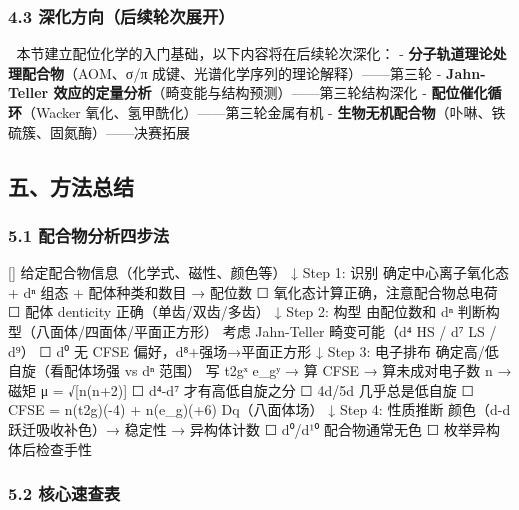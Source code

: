 \documentclass[a4paper,11pt]{ctexart}
\newenvironment{Shaded}{}{}
\newenvironment{Highlighting}{}{}
\newcommand{\NormalTok}[1]{#1}
\begin{document}
\subsubsection{4.3 深化方向（后续轮次展开）}\label{ux6df1ux5316ux65b9ux5411ux540eux7eedux8f6eux6b21ux5c55ux5f00}

🔷 本节建立配位化学的入门基础，以下内容将在后续轮次深化：
- \textbf{分子轨道理论处理配合物}（AOM、σ/π 成键、光谱化学序列的理论解释）------第三轮
- \textbf{Jahn-Teller 效应的定量分析}（畸变能与结构预测）------第三轮结构深化
- \textbf{配位催化循环}（Wacker 氧化、氢甲酰化）------第三轮金属有机
- \textbf{生物无机配合物}（卟啉、铁硫簇、固氮酶）------决赛拓展

\subsection{五、方法总结}\label{ux4e94ux65b9ux6cd5ux603bux7ed3}

\subsubsection{5.1 配合物分析四步法}\label{ux914dux5408ux7269ux5206ux6790ux56dbux6b65ux6cd5}

\begin{Shaded}
\begin{Highlighting}[]
\NormalTok{给定配合物信息（化学式、磁性、颜色等）}
\NormalTok{    ↓}
\NormalTok{Step 1: 识别}
\NormalTok{   确定中心离子氧化态 + dⁿ 组态 + 配体种类和数目 → 配位数}
\NormalTok{    ☐ 氧化态计算正确，注意配合物总电荷}
\NormalTok{    ☐ 配体 denticity 正确（单齿/双齿/多齿）}
\NormalTok{    ↓}
\NormalTok{Step 2: 构型}
\NormalTok{   由配位数和 dⁿ 判断构型（八面体/四面体/平面正方形）}
\NormalTok{   考虑 Jahn{-}Teller 畸变可能（d⁴ HS / d⁷ LS / d⁹）}
\NormalTok{    ☐ d⁰ 无 CFSE 偏好，d⁸+强场→平面正方形}
\NormalTok{    ↓}
\NormalTok{Step 3: 电子排布}
\NormalTok{   确定高/低自旋（看配体场强 vs dⁿ 范围）}
\NormalTok{   写 t2gˣ e\_gʸ → 算 CFSE → 算未成对电子数 n → 磁矩 μ = √[n(n+2)]}
\NormalTok{    ☐ d⁴{-}d⁷ 才有高低自旋之分}
\NormalTok{    ☐ 4d/5d 几乎总是低自旋}
\NormalTok{    ☐ CFSE = n(t2g)({-}4) + n(e\_g)(+6) Dq（八面体场）}
\NormalTok{    ↓}
\NormalTok{Step 4: 性质推断}
\NormalTok{   颜色（d{-}d 跃迁吸收补色）→ 稳定性 → 异构体计数}
\NormalTok{    ☐ d⁰/d¹⁰ 配合物通常无色}
\NormalTok{    ☐ 枚举异构体后检查手性}
\end{Highlighting}
\end{Shaded}

\subsubsection{5.2 核心速查表}\label{ux6838ux5fc3ux901fux67e5ux8868}
\end{document}
